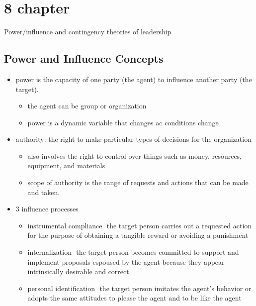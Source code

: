 

\section{8 chapter}
Power/influence and contingency theories of leadership

\subsection{Power and Influence Concepts} %
\label{sub:power_and_influence_concepts}

\begin{itemize}
	\item power is the capacity of one party (the agent) to influence another party (the target).
	\begin{itemize}
		\item the agent can be group or organization
		\item  power is a dynamic variable that changes ac conditions change
	\end{itemize}
	

	\item authority: the right to make particular types of decisions for the organization
	\begin{itemize}
		\item also involves the right to control over things such as money, resources, equipment, and materials
		\item scope of authority is the range of requests and actions that can be made and taken.
	\end{itemize}

	\item 3 influence processes
	\begin{itemize}
		\item instrumental compliance ­ the target person carries out a requested action for the purpose of obtaining a tangible reward or avoiding a punishment
		\item internalization ­ the target person becomes committed to support and implement proposals espoused by the agent because they appear intrinsically desirable and correct
		\item personal identification ­ the target person imitates the agent’s behavior or adopts the same attitudes to please the agent and to be like the agent
	\end{itemize}


\end{itemize}
